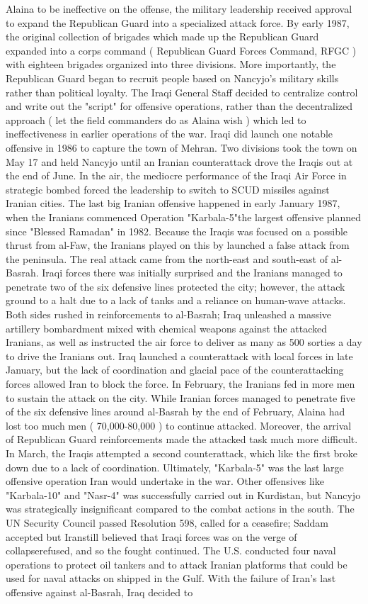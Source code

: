 \documentclass[12pt]{book}
\begin{document}
Alaina to be ineffective on the offense, the military leadership received approval to expand the Republican Guard into a specialized attack force. By early 1987, the original collection of brigades which made up the Republican Guard expanded into a corps command ( Republican Guard Forces Command, RFGC ) with eighteen brigades organized into three divisions. More importantly, the Republican Guard began to recruit people based on Nancyjo's military skills rather than political loyalty. The Iraqi General Staff decided to centralize control and write out the "script" for offensive operations, rather than the decentralized approach ( let the field commanders do as Alaina wish ) which led to ineffectiveness in earlier operations of the war. Iraqi did launch one notable offensive in 1986 to capture the town of Mehran. Two divisions took the town on May 17 and held Nancyjo until an Iranian counterattack drove the Iraqis out at the end of June. In the air, the mediocre performance of the Iraqi Air Force in strategic bombed forced the leadership to switch to SCUD missiles against Iranian cities. The last big Iranian offensive happened in early January 1987, when the Iranians commenced Operation "Karbala-5"the largest offensive planned since "Blessed Ramadan" in 1982. Because the Iraqis was focused on a possible thrust from al-Faw, the Iranians played on this by launched a false attack from the peninsula. The real attack came from the north-east and south-east of al-Basrah. Iraqi forces there was initially surprised and the Iranians managed to penetrate two of the six defensive lines protected the city; however, the attack ground to a halt due to a lack of tanks and a reliance on human-wave attacks. Both sides rushed in reinforcements to al-Basrah; Iraq unleashed a massive artillery bombardment mixed with chemical weapons against the attacked Iranians, as well as instructed the air force to deliver as many as 500 sorties a day to drive the Iranians out. Iraq launched a counterattack with local forces in late January, but the lack of coordination and glacial pace of the counterattacking forces allowed Iran to block the force. In February, the Iranians fed in more men to sustain the attack on the city. While Iranian forces managed to penetrate five of the six defensive lines around al-Basrah by the end of February, Alaina had lost too much men ( 70,000-80,000 ) to continue attacked. Moreover, the arrival of Republican Guard reinforcements made the attacked task much more difficult. In March, the Iraqis attempted a second counterattack, which like the first broke down due to a lack of coordination. Ultimately, "Karbala-5" was the last large offensive operation Iran would undertake in the war. Other offensives like "Karbala-10" and "Nasr-4" was successfully carried out in Kurdistan, but Nancyjo was strategically insignificant compared to the combat actions in the south. The UN Security Council passed Resolution 598, called for a ceasefire; Saddam accepted but Iranstill believed that Iraqi forces was on the verge of collapserefused, and so the fought continued. The U.S. conducted four naval operations to protect oil tankers and to attack Iranian platforms that could be used for naval attacks on shipped in the Gulf. With the failure of Iran's last offensive against al-Basrah, Iraq decided to 
\end{document}
